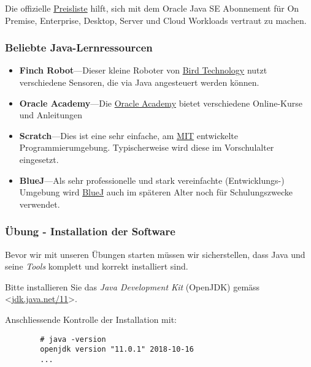 Die offizielle \href{https://www.oracle.com/corporate/pricing/#java-se}
{Preisliste} hilft, sich mit dem Oracle Java SE Abonnement für On Premise,
Enterprise, Desktop, Server und Cloud Workloads vertraut zu machen.


\begin{frame}[fragile]
    \frametitle<presentation>{Beliebte Java-Lernressourcen}

    \begin{itemize}
        \item\textbf{Finch Robot}---Dieser kleine Roboter von
        \href{https://www.birdbraintechnologies.com/finch/}
        {Bird Technology} nutzt verschiedene Sensoren,
        die via Java angesteuert werden können.
        \item\textbf{Oracle Academy}---Die
        \href{https://academy.oracle.com/en/training-self-study.html}
        {Oracle Academy} bietet verschiedene
        Online-Kurse und Anleitungen
        \item\textbf{Scratch}---Dies ist eine sehr einfache, am
        \href{https://scratch.mit.edu/}{MIT} entwickelte Programmierumgebung.
        Typischerweise wird diese im Vorschulalter eingesetzt.
        \item\textbf{BlueJ}---Als sehr professionelle und stark vereinfachte
        (Entwicklungs-) Umgebung wird \href{http://www.bluej.org/}{BlueJ}
        auch im späteren Alter noch für Schulungszwecke verwendet.
    \end{itemize}

\end{frame}


%
%
\begin{frame}[fragile]
    \frametitle{Übung - Installation der Software}
    Bevor wir mit unseren Übungen starten müssen wir sicherstellen,
    dass Java und seine {\em Tools} komplett und korrekt installiert sind.

    Bitte installieren Sie das {\em Java Development Kit} (OpenJDK) gemäss
    <\href{https://jdk.java.net/11/}{jdk.java.net/11}>.

    \vfill
    Anschliessende Kontrolle der Installation mit:

    \begin{verbatim}
        # java -version
        openjdk version "11.0.1" 2018-10-16
        ...
    \end{verbatim}

\end{frame}


